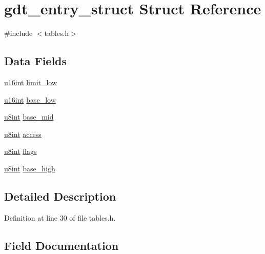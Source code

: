 \hypertarget{structgdt__entry__struct}{}\section{gdt\+\_\+entry\+\_\+struct Struct Reference}
\label{structgdt__entry__struct}


{\ttfamily \#include $<$tables.\+h$>$}

\subsection*{Data Fields}
\begin{DoxyCompactItemize}
\item 
\hyperlink{system_8h_a863d9497073aad2b991aeab2211d87af}{u16int} \hyperlink{structgdt__entry__struct_ada721fbdc3e8d3feae3b07d4b82a37bd}{limit\+\_\+low}
\item 
\hyperlink{system_8h_a863d9497073aad2b991aeab2211d87af}{u16int} \hyperlink{structgdt__entry__struct_a90f05cd7f227a34e977a639843a23275}{base\+\_\+low}
\item 
\hyperlink{system_8h_a1026e682ffdadc1701c42cd44ce9efcf}{u8int} \hyperlink{structgdt__entry__struct_a0369f1e190c433425c5b0f40c2070715}{base\+\_\+mid}
\item 
\hyperlink{system_8h_a1026e682ffdadc1701c42cd44ce9efcf}{u8int} \hyperlink{structgdt__entry__struct_a7457cb21f29e919a8ea62fc0110ac238}{access}
\item 
\hyperlink{system_8h_a1026e682ffdadc1701c42cd44ce9efcf}{u8int} \hyperlink{structgdt__entry__struct_afac75bdf53080168c8899c442862410a}{flags}
\item 
\hyperlink{system_8h_a1026e682ffdadc1701c42cd44ce9efcf}{u8int} \hyperlink{structgdt__entry__struct_aa03c14867c293012449a3b18a07f45f2}{base\+\_\+high}
\end{DoxyCompactItemize}


\subsection{Detailed Description}


Definition at line 30 of file tables.\+h.



\subsection{Field Documentation}
